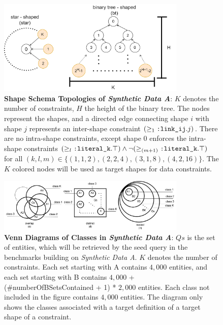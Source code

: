 \begin{figure}
    \centering
    \includegraphics[width=0.8\textwidth]{images/evaluation/shape_schemes_eval.png}
    \caption{\textbf{Shape Schema Topologies of \textit{Synthetic Data A}}: $K$ denotes the number of constraints, $H$ the height of the binary tree. The nodes represent the shapes, and a directed edge connecting shape $i$ with shape $j$ represents an inter-shape constraint $(\geq_1 \texttt{:link\_ij}.j)$. There are no intra-shape constraints, except shape $0$ enforces the intra-shape constraints $(\geq_l \texttt{:literal\_k}.\top) \land \neg(\geq_{(m + 1)} \texttt{:literal\_k}.\top)$ for all $(k,l,m) \in \{(1,1,2),(2,2,4),(3,1,8),(4,2,16)\}$.
    The $K$ colored nodes will be used as target shapes for data constraints.}
    \label{fig:shape_schemes_eval}
\end{figure}

\begin{figure}
    \centering
    \includegraphics[width=0.8\textwidth]{images/evaluation/classes_eval.png}
    \caption{\textbf{Venn Diagrams of Classes in \textit{Synthetic Data A}}: $Qs$ is the set of entities, which will be retrieved by the seed query in the benchmarks building on \textit{Synthetic Data A}. $K$ denotes the number of constraints. Each set starting with A contains $4,000$ entities, and each set starting with B contains $4,000$ + (\#numberOfBSetsContained + 1) * $2,000$ entities. Each class not included in the figure contains $4,000$ entities. The diagram only shows the classes associated with a target definition of a target shape of a constraint.}
    \label{fig:class_venn_diagram_eval}
\end{figure}

